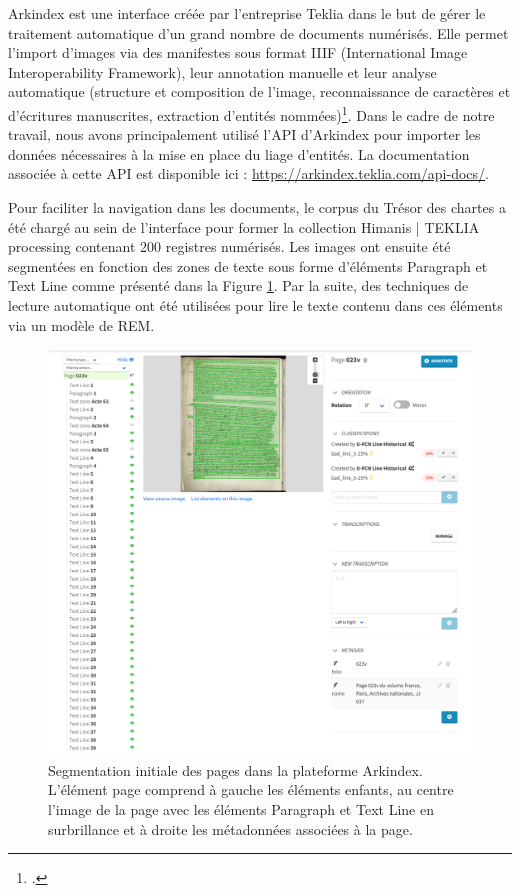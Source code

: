 \documentclass[a4paper,12pt,twoside]{book}
\begin{document}
	Arkindex est une interface créée par l'entreprise Teklia dans le but de gérer le traitement automatique d'un grand nombre de documents numérisés. Elle permet l'import d'images via des manifestes sous format IIIF (International Image Interoperability Framework), leur annotation manuelle et leur analyse automatique (structure et composition de l'image, reconnaissance de caractères et d'écritures manuscrites, extraction d'entités nommées)\footcite{noauthor_teklia_nodate}. Dans le cadre de notre travail, nous avons principalement utilisé l'API d'Arkindex pour importer les données nécessaires à la mise en place du liage d'entités. La documentation associée à cette API est disponible ici : \url{https://arkindex.teklia.com/api-docs/}.
	
	Pour faciliter la navigation dans les documents, le corpus du Trésor des chartes a été chargé au sein de l'interface pour former la collection \og Himanis | TEKLIA processing\fg{} contenant 200 registres numérisés. Les images ont ensuite été segmentées en fonction des zones de texte sous forme d'éléments \og Paragraph\fg{} et \og Text Line\fg{} comme présenté dans la Figure \ref{Page_Initiale_Arkindex}. Par la suite, des techniques de lecture automatique ont été utilisées pour lire le texte contenu dans ces éléments via un modèle de REM.
	
	\begin{figure}
		\centering
		\includegraphics[width=\textwidth]{Images/Interface_Arkindex.png}
		\caption{Segmentation initiale des pages dans la plateforme Arkindex. L'élément page comprend à gauche les éléments enfants, au centre l'image de la page avec les éléments \og Paragraph\fg{} et \og Text Line\fg{} en surbrillance et à droite les métadonnées associées à la page.}
		\label{Page_Initiale_Arkindex}
	\end{figure}
	
\end{document}
